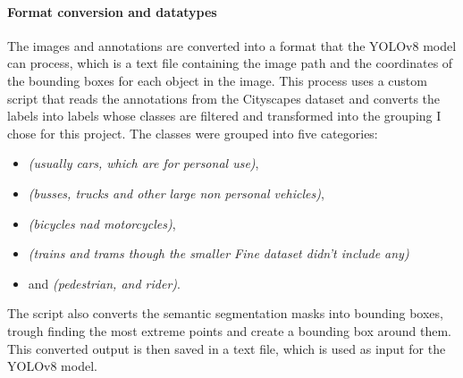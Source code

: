 \paragraph{Format conversion and datatypes}\label{par:formatconversion}
The images and annotations are converted into a format that the YOLOv8 model can process, which is
a text file containing the image path and the coordinates of the bounding boxes for each object in the image.
This process uses a custom script that reads the annotations from the Cityscapes dataset and converts the labels
into labels whose classes are filtered and transformed into the grouping I chose for this project.
The classes were grouped into five categories:
\begin{itemize}
    \item {}\textit{(usually cars, which are for personal use)},
    \item {}\textit{(busses, trucks and other large non personal vehicles)},
    \item {}\textit{(bicycles nad motorcycles)},
    \item {}\textit{(trains and trams though the smaller Fine dataset didn't include any)}
    \item and  \textit{(pedestrian, and rider)}.
\end{itemize}

The script also converts the semantic segmentation masks into bounding boxes, trough finding the most extreme points and
create a bounding box around them.
This converted output is then saved in a text file, which is used as input for the YOLOv8 model.

